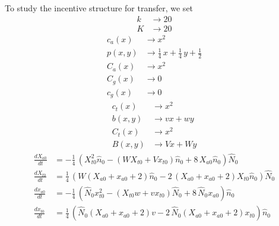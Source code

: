 \documentclass{article}
\begin{document}
To study the incentive structure for transfer, we set\begin{align*}
  k &\to 20 \\
  K &\to 20
\end{align*}\begin{align*}
  c_a(x) &\to x^{2}\\
  p(x,y) &\to \frac{1}{4} \, x + \frac{1}{4} \, y + \frac{1}{2}\\
  C_a(x) &\to x^{2}\\
  C_g(x) &\to 0\\
  c_g(x) &\to 0
\end{align*}\begin{align*}
  c_t(x) &\to x^{2}\\
  b(x,y) &\to v x + w y\\
  C_t(x) &\to x^{2}\\
  B(x,y) &\to V x + W y
\end{align*}\iflatexml
\begin{align*}
\frac{d{X}_{{a}{0}}}{dt} &= -\frac{1}{4} \, {\left({X}_{{t}{0}}^{2} \hat{{n}}_{0} - {\left(W {X}_{{t}{0}} + V {x}_{{t}{0}}\right)} \hat{{n}}_{0} + 8 \, {X}_{{a}{0}} \hat{{n}}_{0}\right)} \hat{{N}}_{0}\\
\frac{d{X}_{{t}{0}}}{dt} &= \frac{1}{4} \, {\left(W {\left({X}_{{a}{0}} + {x}_{{a}{0}} + 2\right)} \hat{{n}}_{0} - 2 \, {\left({X}_{{a}{0}} + {x}_{{a}{0}} + 2\right)} {X}_{{t}{0}} \hat{{n}}_{0}\right)} \hat{{N}}_{0}\\
\frac{d{x}_{{a}{0}}}{dt} &= -\frac{1}{4} \, {\left(\hat{{N}}_{0} {x}_{{t}{0}}^{2} - {\left({X}_{{t}{0}} w + v {x}_{{t}{0}}\right)} \hat{{N}}_{0} + 8 \, \hat{{N}}_{0} {x}_{{a}{0}}\right)} \hat{{n}}_{0}\\
\frac{d{x}_{{t}{0}}}{dt} &= \frac{1}{4} \, {\left(\hat{{N}}_{0} {\left({X}_{{a}{0}} + {x}_{{a}{0}} + 2\right)} v - 2 \, \hat{{N}}_{0} {\left({X}_{{a}{0}} + {x}_{{a}{0}} + 2\right)} {x}_{{t}{0}}\right)} \hat{{n}}_{0}
\end{align*}
\else
\end{document}
